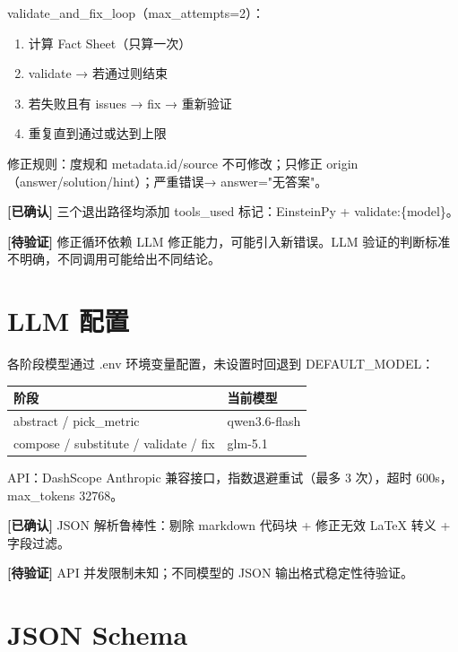 \documentclass[12pt,a4paper]{article}
\newcommand{\certain}[1]{{\color{certcolor}\textbf{[已确认]}} #1}
\newcommand{\uncertain}[1]{{\color{uncertcolor}\textbf{[待验证]}} #1}
\begin{document}
validate\_and\_fix\_loop（max\_attempts=2）：

\begin{enumerate}
    \item 计算 Fact Sheet（只算一次）
    \item validate → 若通过则结束
    \item 若失败且有 issues → fix → 重新验证
    \item 重复直到通过或达到上限
\end{enumerate}

修正规则：度规和 metadata.id/source 不可修改；只修正 origin（answer/solution/hint）；严重错误→ answer="无答案"。

\certain{三个退出路径均添加 tools\_used 标记：EinsteinPy + validate:\{model\}。}

\uncertain{修正循环依赖 LLM 修正能力，可能引入新错误。LLM 验证的判断标准不明确，不同调用可能给出不同结论。}

\section{LLM 配置}

各阶段模型通过 .env 环境变量配置，未设置时回退到 DEFAULT\_MODEL：

\begin{center}
\begin{tabular}{ll}
\toprule
阶段 & 当前模型 \\
\midrule
abstract / pick\_metric & qwen3.6-flash \\
compose / substitute / validate / fix & glm-5.1 \\
\bottomrule
\end{tabular}
\end{center}

API：DashScope Anthropic 兼容接口，指数退避重试（最多 3 次），超时 600s，max\_tokens 32768。

\certain{JSON 解析鲁棒性：剔除 markdown 代码块 + 修正无效 LaTeX 转义 + 字段过滤。}

\uncertain{API 并发限制未知；不同模型的 JSON 输出格式稳定性待验证。}

\section{JSON Schema}
\end{document}
